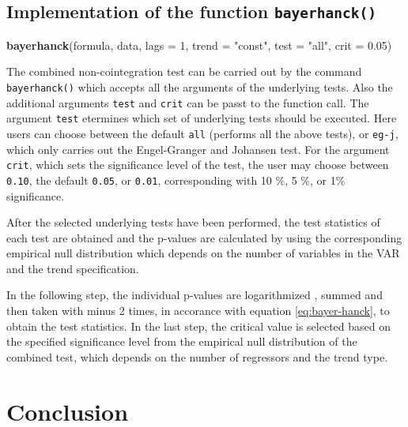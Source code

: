 \documentclass[11pt,a4paper]{article}
\newenvironment{Shaded}{\begin{snugshade}}{\end{snugshade}}
\newcommand{\DataTypeTok}[1]{\textcolor[rgb]{0.13,0.29,0.53}{#1}}
\newcommand{\DecValTok}[1]{\textcolor[rgb]{0.00,0.00,0.81}{#1}}
\newcommand{\FloatTok}[1]{\textcolor[rgb]{0.00,0.00,0.81}{#1}}
\newcommand{\KeywordTok}[1]{\textcolor[rgb]{0.13,0.29,0.53}{\textbf{#1}}}
\newcommand{\NormalTok}[1]{#1}
\newcommand{\StringTok}[1]{\textcolor[rgb]{0.31,0.60,0.02}{#1}}
\begin{document}
\hypertarget{implementation-of-the-function-bayerhanck}{%
\subsection{\texorpdfstring{Implementation of the function
\texttt{bayerhanck()}}{Implementation of the function bayerhanck()}}\label{implementation-of-the-function-bayerhanck}}

\begin{Shaded}
\begin{Highlighting}[]
\KeywordTok{bayerhanck}\NormalTok{(formula, data, }\DataTypeTok{lags =} \DecValTok{1}\NormalTok{, }\DataTypeTok{trend =} \StringTok{"const"}\NormalTok{, }
           \DataTypeTok{test =} \StringTok{"all"}\NormalTok{, }\DataTypeTok{crit =} \FloatTok{0.05}\NormalTok{)}
\end{Highlighting}
\end{Shaded}

The combined non-cointegration test can be carried out by the command
\texttt{bayerhanck()} which accepts all the arguments of the underlying
tests. Also the additional arguments \texttt{test} and \texttt{crit} can
be passt to the function call. The argument \texttt{test} etermines
which set of underlying tests should be executed. Here users can choose
between the default \texttt{all} (performs all the above tests), or
\texttt{eg-j}, which only carries out the Engel-Granger and Johansen
test. For the argument \texttt{crit}, which sets the significance level
of the test, the user may choose between \texttt{0.10}, the default
\texttt{0.05}, or \texttt{0.01}, corresponding with 10 \%, 5 \%, or 1\%
significance.

After the selected underlying tests have been performed, the test
statistics of each test are obtained and the p-values are calculated by
using the corresponding empirical null distribution which depends on the
number of variables in the VAR and the trend specification.

In the following step, the individual p-values are logarithmized ,
summed and then taken with minus 2 times, in accorance with equation
\eqref{eq:bayer-hanck}, to obtain the test statistics. In the last step,
the critical value is selected based on the specified significance level
from the empirical null distribution of the combined test, which depends
on the number of regressors and the trend type.

\hypertarget{conclusion}{%
\section{Conclusion}\label{conclusion}}
\end{document}
